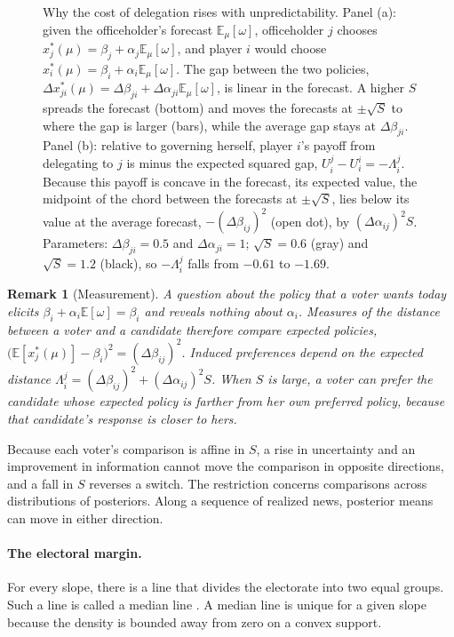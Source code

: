\documentclass[12pt,letterpaper]{article}
\newtheorem{remark}{Remark}
\begin{document}
\begin{figure}[tbp]
\caption{Why the cost of delegation rises with unpredictability. Panel (a): given the officeholder's forecast $\mathbb{E}_\mu[\omega]$, officeholder $j$ chooses $x_j^*(\mu)=\beta_j+\alpha_j\mathbb{E}_\mu[\omega]$, and player $i$ would choose $x_i^*(\mu)=\beta_i+\alpha_i\mathbb{E}_\mu[\omega]$. The gap between the two policies, $\Delta x^*_{ji}(\mu)=\Delta\beta_{ji}+\Delta\alpha_{ji}\mathbb{E}_\mu[\omega]$, is linear in the forecast. A higher $S$ spreads the forecast (bottom) and moves the forecasts at $\pm\sqrt{S}$ to where the gap is larger (bars), while the average gap stays at $\Delta\beta_{ji}$. Panel (b): relative to governing herself, player $i$'s payoff from delegating to $j$ is minus the expected squared gap, $U_i^j-U_i^i=-\Lambda_i^j$. Because this payoff is concave in the forecast, its expected value, the midpoint of the chord between the forecasts at $\pm\sqrt{S}$, lies below its value at the average forecast, $-(\Delta\beta_{ij})^2$ (open dot), by $(\Delta\alpha_{ij})^2S$. Parameters: $\Delta\beta_{ji}=0.5$ and $\Delta\alpha_{ji}=1$; $\sqrt{S}=0.6$ (gray) and $\sqrt{S}=1.2$ (black), so $-\Lambda_i^j$ falls from $-0.61$ to $-1.69$.}
\label{fig:delegation}
\end{figure}

\begin{remark}[Measurement]\label{rem:measurement}
A question about the policy that a voter wants today elicits $\beta_i+\alpha_i\mathbb{E}[\omega]=\beta_i$ and reveals nothing about $\alpha_i$. Measures of the distance between a voter and a candidate therefore compare expected policies, $\big(\mathbb{E}[x^*_j(\mu)]-\beta_i\big)^2=(\Delta\beta_{ij})^2$. Induced preferences depend on the expected distance $\Lambda_i^j=(\Delta\beta_{ij})^2+(\Delta\alpha_{ij})^2S$. When $S$ is large, a voter can prefer the candidate whose expected policy is farther from her own preferred policy, because that candidate's response is closer to hers.
\end{remark}

Because each voter's comparison is affine in $S$, a rise in uncertainty and an improvement in information cannot move the comparison in opposite directions, and a fall in $S$ reverses a switch. The restriction concerns comparisons across distributions of posteriors. Along a sequence of realized news, posterior means can move in either direction.

\paragraph{The electoral margin.}
For every slope, there is a line that divides the electorate into two equal groups. Such a line is called a median line \citep{DavisDeGrootHinich1972,McKelvey1986}. A median line is unique for a given slope because the density is bounded away from zero on a convex support.
\end{document}
